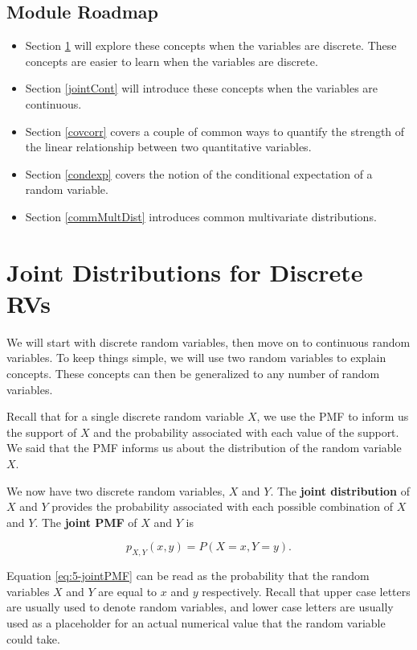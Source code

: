 \documentclass[
]{book}
\providecommand{\tightlist}{%
  \setlength{\itemsep}{0pt}\setlength{\parskip}{0pt}}
\begin{document}
\hypertarget{module-roadmap-3}{%
\subsection{Module Roadmap}\label{module-roadmap-3}}

\begin{itemize}
\tightlist
\item
  Section \ref{jointDis} will explore these concepts when the variables are discrete. These concepts are easier to learn when the variables are discrete.
\item
  Section \ref{jointCont} will introduce these concepts when the variables are continuous.
\item
  Section \ref{covcorr} covers a couple of common ways to quantify the strength of the linear relationship between two quantitative variables.
\item
  Section \ref{condexp} covers the notion of the conditional expectation of a random variable.
\item
  Section \ref{commMultDist} introduces common multivariate distributions.
\end{itemize}

\hypertarget{jointDis}{%
\section{Joint Distributions for Discrete RVs}\label{jointDis}}

We will start with discrete random variables, then move on to continuous random variables. To keep things simple, we will use two random variables to explain concepts. These concepts can then be generalized to any number of random variables.

Recall that for a single discrete random variable \(X\), we use the PMF to inform us the support of \(X\) and the probability associated with each value of the support. We said that the PMF informs us about the distribution of the random variable \(X\).

We now have two discrete random variables, \(X\) and \(Y\). The \textbf{joint distribution} of \(X\) and \(Y\) provides the probability associated with each possible combination of \(X\) and \(Y\). The \textbf{joint PMF} of \(X\) and \(Y\) is

\begin{equation} 
p_{X,Y}(x,y) = P(X=x, Y=y).
\label{eq:5-jointPMF}
\end{equation}

Equation \eqref{eq:5-jointPMF} can be read as the probability that the random variables \(X\) and \(Y\) are equal to \(x\) and \(y\) respectively. Recall that upper case letters are usually used to denote random variables, and lower case letters are usually used as a placeholder for an actual numerical value that the random variable could take.
\end{document}

